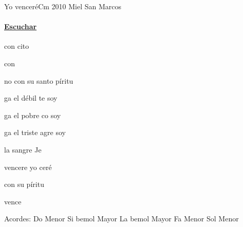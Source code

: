 \documentclass[12pt, spanish]{book}
\newcommand{\NotCCLIed}{\relax}
\begin{document}
    \begin{song}{Yo venceré}{Cm}
        {2010} %
        {Miel San Marcos}
        {} %
        {} %
        \ifChordBk
        \paragraph{\mbox{}\hfill\protect\href{}{Escuchar}\mbox{}\hfill}
        \fi




        \begin{SBChorus}
              con cito

              con 

            no con su santo píritu
        \end{SBChorus}

        \begin{SBOpGroup}
            ga el débil te soy

            ga el pobre co soy

            ga el triste agre soy

             la sangre  Je
        \end{SBOpGroup}
        \vskip 20pt
        \begin{SBOpGroup}
             vencere yo ceré

            con su píritu

             vence
        \end{SBOpGroup}

        \ifChordBk
        \begin{SBOpGroup}
            Acordes:\break
            \upchord{\Cm}\qquad Do Menor \hfill
            \upchord{\Bflat}\qquad Si bemol Mayor \hfill\null\break
            \upchord{\Aflat}\qquad La bemol Mayor \hfill
            \upchord{\Fm}\qquad Fa Menor \hfill
            \upchord{\Gm}\qquad Sol Menor \hfill\null\break
        \end{SBOpGroup}
        \fi


\end{song}
\end{document}
